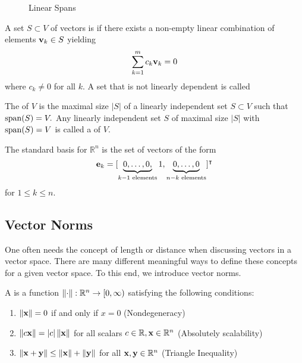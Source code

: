 \begin{figure}[H]%
\centering
{}
\hfill
\caption{Linear Spans}
\end{figure}

\begin{definition}
A set $S \subset V$ of vectors is  if there exists a non-empty linear combination of elements $\vv_k \in S$ yielding 
$$\sum_{k = 1}^m c_k \vv_k = 0$$
where $c_k \not = 0$ for all $k$. A set that is not linearly dependent is called 
\end{definition}

\begin{definition}
The  of $V$ is the maximal size $|S|$ of a linearly independent set $S \subset V$ such that $\spann(S) = V.$
Any linearly independent set $S$ of maximal size $|S|$ with $\spann(S) = V$ is called a  of $V$.
\end{definition}

\begin{example}
The standard basis for $\mathbb R^n$ is the set of vectors of the form 
$$\ve_k = [ \underbrace{0, \ldots, 0,}_{k - 1 \text{ elements}} 1, \underbrace{0, \ldots, 0}_{n - k \text{ elements}}]^\intercal$$
for $1\leq k\leq n$.
\end{example}

\subsection{Vector Norms}

One often needs the concept of length or distance when discussing vectors in a vector space. There are many different meaningful ways to define these concepts for a given vector space. To this end, we introduce vector norms.

\begin{definition}\label{norm-def}
A  is a function $\norm{\cdot} : \R^n \rightarrow [0, \infty)$ satisfying the following conditions: 
\begin{enumerate}
\item $\norm{\vx} = 0$ if and only if $x = 0$ (Nondegeneracy)
\item $\norm{c\vx} = |c| \norm{\vx}$ for all scalars $c \in \R, \vx \in \R^n$ (Absolutely scalability) 
\item $\norm{\vx + \vy} \leq \norm{\vx} + \norm{\vy}$ for all $\vx,\vy \in \R^n$ (Triangle Inequality)
\end{enumerate}
\end{definition}

